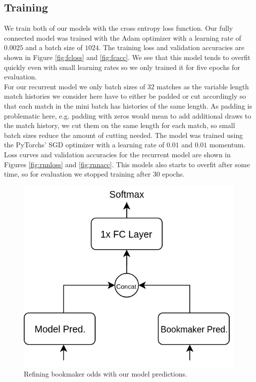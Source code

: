 \documentclass[a4paper]{article}
\begin{document}
\subsection{Training}
We train both of our models with the cross entropy loss function. Our fully
connected model was trained with the Adam \cite{Adam} optimizer with a learning
rate of $0.0025$ and a batch size of $1024$. The training loss and validation
accuracies are shown in Figure \ref{fig:fcloss} and
\ref{fig:fcacc}. We see that this model tends to overfit quickly even with
small learning rates so we only trained it for five epochs for evaluation.
\\
For our recurrent model we only batch sizes of $32$ matches as the variable
length match histories we consider here have to either be padded or cut
accordingly so that each match in the mini batch has histories of the same
length. As padding is problematic here, e.g. padding with zeros would mean to
add additional draws to the match history, we cut them on the same length for
each match, so small batch sizes reduce the amount of cutting needed. The model
was trained using the PyTorchs' SGD optimizer with a learning rate of $0.01$ and
$0.01$ momentum. Loss curves and validation accuracies for the recurrent model
are shown in Figures \ref{fig:rnnloss} and \ref{fig:rnnacc}. This models also
starts to overfit after some time, so for evaluation we stopped training after
30 epochs.

\begin{figure} 
\includegraphics[scale=0.28]{img/Siamese3.png}
\caption{Refining bookmaker odds with our model predictions.}
\label{fig:oddsref}
\end{figure}
\end{document}
